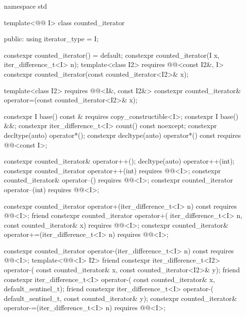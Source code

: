 %
\begin{codeblock}
namespace std {
  template<@@ I>
  class counted_iterator {
  public:
    using iterator_type = I;

    constexpr counted_iterator() = default;
    constexpr counted_iterator(I x, iter_difference_t<I> n);
    template<class I2>
      requires @@<const I2&, I>
        constexpr counted_iterator(const counted_iterator<I2>& x);

    template<class I2>
      requires @@<I&, const I2&>
        constexpr counted_iterator& operator=(const counted_iterator<I2>& x);

    constexpr I base() const & requires copy_constructible<I>;
    constexpr I base() &&;
    constexpr iter_difference_t<I> count() const noexcept;
    constexpr decltype(auto) operator*();
    constexpr decltype(auto) operator*() const
      requires @@<const I>;

    constexpr counted_iterator& operator++();
    decltype(auto) operator++(int);
    constexpr counted_iterator operator++(int)
      requires @@<I>;
    constexpr counted_iterator& operator--()
      requires @@<I>;
    constexpr counted_iterator operator--(int)
      requires @@<I>;

    constexpr counted_iterator operator+(iter_difference_t<I> n) const
      requires @@<I>;
    friend constexpr counted_iterator operator+(
      iter_difference_t<I> n, const counted_iterator& x)
        requires @@<I>;
    constexpr counted_iterator& operator+=(iter_difference_t<I> n)
      requires @@<I>;

    constexpr counted_iterator operator-(iter_difference_t<I> n) const
      requires @@<I>;
    template<@@<I> I2>
      friend constexpr iter_difference_t<I2> operator-(
        const counted_iterator& x, const counted_iterator<I2>& y);
    friend constexpr iter_difference_t<I> operator-(
      const counted_iterator& x, default_sentinel_t);
    friend constexpr iter_difference_t<I> operator-(
      default_sentinel_t, const counted_iterator& y);
    constexpr counted_iterator& operator-=(iter_difference_t<I> n)
      requires @@<I>;

}}
\end{codeblock}
